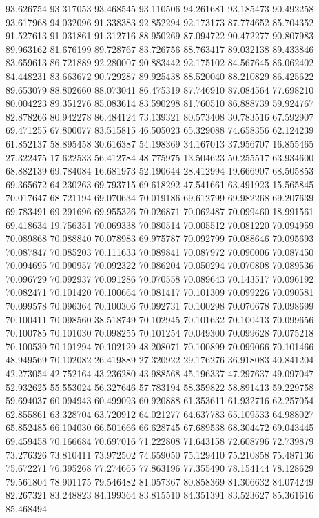 93.626754
93.317053
93.468545
93.110506
94.261681
93.185473
90.492258
93.617968
94.032096
91.338383
92.852294
92.173173
87.774652
85.704352
91.527613
91.031861
91.312716
88.950269
87.094722
90.472277
90.807983
89.963162
81.676199
89.728767
83.726756
88.763417
89.032138
89.433846
83.659613
86.721889
92.280007
90.883442
92.175102
84.567645
86.062402
84.448231
83.663672
90.729287
89.925438
88.520040
88.210829
86.425622
89.653079
88.802660
88.073041
86.475319
87.746910
87.084564
77.698210
80.004223
89.351276
85.083614
83.590298
81.760510
86.888739
59.924767
82.878266
80.942278
86.484124
73.139321
80.573408
30.783516
67.592907
69.471255
67.800077
83.515815
46.505023
65.329088
74.658356
62.124239
61.852137
58.895458
30.616387
54.198369
34.167013
37.956707
16.855465
27.322475
17.622533
56.412784
48.775975
13.504623
50.255517
63.934600
68.882139
69.784084
16.681973
52.190644
28.412994
19.666907
68.505853
69.365672
64.230263
69.793715
69.618292
47.541661
63.491923
15.565845
70.017647
68.721194
69.070634
70.019186
69.612799
69.982268
69.207639
69.783491
69.291696
69.955326
70.026871
70.062487
70.099460
18.991561
69.418634
19.756351
70.069338
70.080514
70.005512
70.081220
70.094959
70.089868
70.088840
70.078983
69.975787
70.092799
70.088646
70.095693
70.087847
70.085203
70.111633
70.089841
70.087972
70.090006
70.087450
70.094695
70.090957
70.092322
70.086204
70.050294
70.070808
70.089536
70.096729
70.092937
70.091286
70.070558
70.089643
70.143517
70.096192
70.082471
70.101420
70.100664
70.081417
70.101309
70.099226
70.090581
70.099578
70.096364
70.100306
70.092731
70.100298
70.070678
70.098699
70.100411
70.098560
38.518749
70.102945
70.101632
70.100413
70.099656
70.100785
70.101030
70.098255
70.101254
70.049300
70.099628
70.075218
70.100539
70.101294
70.102129
48.208071
70.100899
70.099066
70.101466
48.949569
70.102082
26.419889
27.320922
29.176276
36.918083
40.841204
42.273054
42.752164
43.236280
43.988568
45.196337
47.297637
49.097047
52.932625
55.553024
56.327646
57.783194
58.359822
58.891413
59.229758
59.694037
60.094943
60.499093
60.920888
61.353611
61.932716
62.257054
62.855861
63.328704
63.720912
64.021277
64.637783
65.109533
64.988027
65.852485
66.104030
66.501666
66.628745
67.689538
68.304472
69.043445
69.459458
70.166684
70.697016
71.222808
71.643158
72.608796
72.739879
73.276326
73.810411
73.972502
74.659050
75.129410
75.210858
75.487136
75.672271
76.395268
77.274665
77.863196
77.355490
78.154144
78.128629
79.561804
78.901175
79.546482
81.057367
80.858369
81.306632
84.074249
82.267321
83.248823
84.199364
83.815510
84.351391
83.523627
85.361616
85.468494
